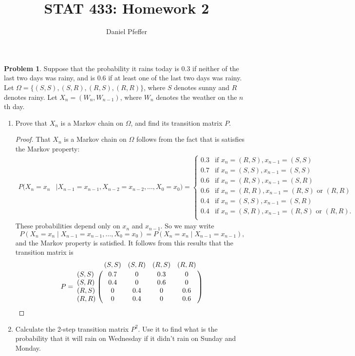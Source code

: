 \documentclass[oneside,reqno]{amsart}
\title{STAT 433: Homework 2}
\author{Daniel Pfeffer}
\theoremstyle{definition}
\newtheorem{prob}{Problem}
\begin{document}
\maketitle


\begin{prob}
Suppose that the probability it rains today is 0.3 if neither of the last two days was rainy, and is 0.6 if at least one of the last two days was rainy. Let $\Omega = \{(S,S), (S,R), (R,S), (R,R)\}$, where $S$ denotes sunny and $R$ denotes rainy. Let $X_n = (W_n, W_{n-1})$, where $W_n$ denotes the weather on the $n$th day.
\end{prob}


\begin{enumerate}
\item
Prove that $X_n$ is a Markov chain on $\Omega$, and find its transition matrix $P$.
\begin{proof}
That $X_n$ is a Markov chain on $\Omega$ follows from the fact that is satisfies the Markov property:
\begin{align*}
	P(X_n = x_n & \mid X_{n-1} = x_{n-1}, X_{n-2} = x_{n-2}, \dotsc, X_0 = x_0) 
	= \begin{cases}
		0.3 & \text{if } x_n = (R,S), x_{n-1}= (S,S) \\
		0.7 & \text{if } x_n = (S,S), x_{n-1}= (S,S) \\
		0.6 & \text{if } x_n = (R,S), x_{n-1}= (S,R) \\
		0.6 & \text{if } x_n = (R,R), x_{n-1}= (R,S) \text{ or } (R,R) \\
		0.4 & \text{if } x_n = (S,S), x_{n-1}= (S,R) \\
		0.4 & \text{if } x_n = (S,R), x_{n-1}= (R,S) \text{ or } (R,R). \\
	\end{cases}
\end{align*}
These probabilities depend only on $x_n$ and $x_{n-1}$. So we may write 
\[
	 P(X_n = x_n  \mid X_{n-1} = x_{n-1}, \dotsc, X_0 = x_0) = P(X_n = x_n \mid X_{n-1} = x_{n-1}),
\]
and the Markov property is satisfied. It follows from this results that the transition matrix is 
\[
	P = \bordermatrix{~ & (S,S) & (S,R) & (R,S) &(R,R) \cr 
		(S,S) & 0.7 & 0 & 0.3 & 0 \cr
		(S,R) & 0.4 & 0 & 0.6 & 0 \cr
		(R,S) & 0 & 0.4 & 0 & 0.6 \cr
		(R,R) & 0 & 0.4 & 0 & 0.6 \cr}
\]
\end{proof}
\item
Calculate the 2-step transition matrix $P^2$. Use it to find what is the probability that it will rain on Wednesday if it didn't rain on Sunday and Monday.

\end{enumerate}
\end{document}

